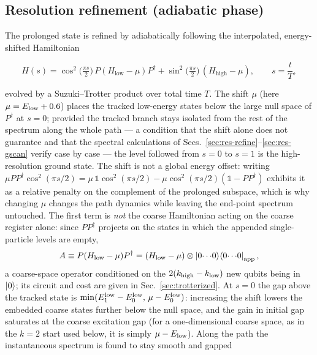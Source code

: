 \documentclass[
  aps,            %
  prc,            %
  reprint,        %
  superscriptaddress,
  floatfix,
  nofootinbib
]{revtex4-2}
\newcommand{\Hlow}{H_{\mathrm{low}}}
\newcommand{\Hhigh}{H_{\mathrm{high}}}
\begin{document}
\subsection{Resolution refinement (adiabatic phase)}
\label{sec:refine}
The prolonged state is refined by adiabatically following the interpolated,
energy-shifted Hamiltonian
\begin{widetext}
\begin{equation}
  H(s)=\cos^2\!\Big(\tfrac{\pi s}{2}\Big)\,P(\Hlow-\mu)P^\dagger
      +\sin^2\!\Big(\tfrac{\pi s}{2}\Big)\,(\Hhigh-\mu),
  \qquad s=\frac{t}{T},
  \label{eq:path}
\end{equation}
\end{widetext}
evolved by a Suzuki--Trotter product over total time $T$.  The shift $\mu$
(here $\mu=E_{\rm low}+0.6$) places the tracked low-energy states below the large
null space of $P^\dagger$ at $s=0$; provided the tracked branch stays
isolated from the rest of the spectrum along the whole path --- a condition
that the shift alone does not guarantee and that the spectral calculations
of Secs.~\ref{sec:res-refine}--\ref{sec:res-gscan} verify case by case --- the level followed from
$s=0$ to $s=1$ is the high-resolution ground state.  The shift is not a
global energy offset: writing $\mu PP^\dagger\cos^2(\pi s/2)=\mu\,\mathbb1
\cos^2(\pi s/2)-\mu\cos^2(\pi s/2)(\mathbb1-PP^\dagger)$ exhibits it as a
relative penalty on the complement of the prolonged subspace, which is why
changing $\mu$ changes the path dynamics while leaving the end-point
spectrum untouched.  The first term is \emph{not} the coarse
Hamiltonian acting on the coarse register alone: since $PP^\dagger$ projects on
the states in which the appended single-particle levels are empty,
\begin{equation}
  A\equiv P(\Hlow-\mu)P^\dagger=(\Hlow-\mu)\otimes
  \ket{0\!\cdots\!0}\!\bra{0\!\cdots\!0}_{\rm app},
  \label{eq:Aterm}
\end{equation}
a coarse-space operator conditioned on the $2(k_{\rm high}-k_{\rm low})$ new
qubits being in $\ket{0}$; its circuit and cost are given in
Sec.~\ref{sec:trotterized}.  At $s=0$ the gap above the tracked state is
$\min(E_1^{\rm low}-E_0^{\rm low},\,\mu-E_0^{\rm low})$: increasing the shift
lowers the embedded coarse states further below the null space, and the gain
in initial gap saturates at the coarse excitation gap (for a one-dimensional
coarse space, as in the $k=2$ start used below, it is simply $\mu-E_{\rm low}$).
Along the path the instantaneous spectrum is found to stay smooth and gapped
\end{document}
